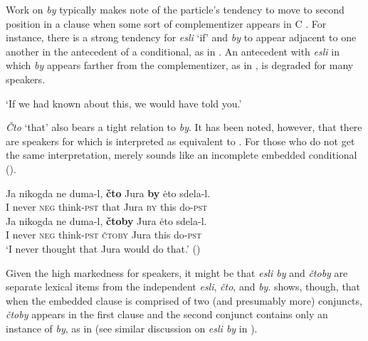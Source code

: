 \documentclass[output=paper,
modfonts,
newtxmath,
hidelinks,
]{langscibook}
\begin{document}
Work on \textit{by} typically makes note of the particle’s tendency to move to second position in a clause when some sort of complementizer appears in C \citep[29]{Hacking1998}. For instance, there is a strong tendency for \textit{esli} ‘if’ and \textit{by} to appear adjacent to one another in the antecedent of a conditional, as in . An antecedent with \textit{esli} in which \textit{by} appears farther from the complementizer, as in , is degraded for many speakers. 

\ea 
{}
\z 
\glt `If we had known about this, we would have told you.'\hfill \citep[29]{Hacking1998}
\z

\noindent \textit{Čto} ‘that’ also bears a tight relation to \textit{by}. It has been noted, however, that there are speakers for which  is interpreted as equivalent to . For those who do not get the same interpretation,  merely sounds like an incomplete embedded conditional (\citealt[40]{Brecht1977}).

\ea \ea\label{10:ex26}
\gll Ja nikogda ne duma-l, \textbf{čto} Jura \textbf{by} \.eto sdela-l.\\
     I never \textsc{neg} think\textsc{-pst} that Jura \textsc{by} this do\textsc{-pst}\\
     \ex \label{10:ex27}
\gll Ja nikogda ne duma-l, \textbf{čtoby} Jura \.eto sdela-l.\\
     I never \textsc{neg} think\textsc{-pst} \textsc{čtoby} Jura this do\textsc{-pst}\\
\z
\glt `I never thought that Jura would do that.' \hfill (\citealt[40, fn. 10]{Brecht1977})
\z


\noindent Given the high markedness for speakers, it might be that \textit{esli by} and \textit{čtoby} are separate lexical items from the independent \textit{esli}, \textit{čto}, and \textit{by}. \citet{Brecht1977} shows, though, that when the embedded clause is comprised of two (and presumably more) conjuncts, \textit{čtoby} appears in the first clause and the second conjunct contains only an instance of \textit{by}, as in  (see similar discussion on \textit{esli by} in \citealt[29-32]{Hacking1998}).
\end{document}
